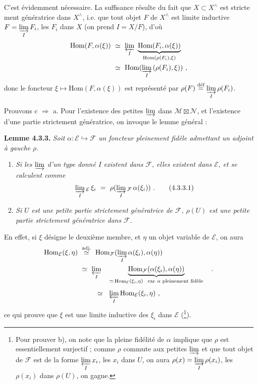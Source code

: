\documentclass[11pt]{article}
\newcommand{\printedpage}[1]{\if\relax\detokenize{#1}\relax\else\marginpar{\footnotesize p.~#1}\fi}
\newcommand{\msp}[1]{\marginpar{\footnotesize [#1]}}
\newcommand{\Hom}{\mathrm{Hom}}
\begin{document}
\noindent C'est évidemment nécessaire. La suffisance résulte du fait que $X\subset X^\wedge$ est stricte%
\printedpage{10}%
\msp{page 67}%
ment génératrice dans $X^\wedge$, i.e. que tout objet $F$ de $X^\wedge$ est limite inductive $F=\varinjlim\limits_I F_i$, les $F_i$ dans $X$ (on prend $I=X/F$), d'où
\[
\begin{aligned}
\Hom(F,\alpha(\xi))\ &\simeq\ \varprojlim_I\ \underbrace{\Hom(F_i,\alpha(\xi))}_{\Hom(\rho(F_i),\xi)}\\
&\simeq\ \Hom(\varinjlim_I\,(\rho(F_i),\xi))\ ,
\end{aligned}
\]
donc le foncteur $\xi\longmapsto\Hom(F,\alpha(\xi))$ est représenté par $\rho(F)\overset{\text{déf}}{=}\varinjlim\limits_I\rho(F_i)$.

\noindent Prouvons c $\Longrightarrow$ a. Pour l'existence des petites $\varinjlim$ dans $\mathcal M\boxtimes\mathcal N$, et l'existence d'une partie strictement génératrice, on invoque le lemme général :

\noindent\textbf{Lemme 4.3.3.} \textit{Soit $\alpha:\mathcal E\hookrightarrow\mathcal F$ un foncteur pleinement fidèle admettant un adjoint à gauche $\rho$.}
\begin{enumerate}[label={}]
\item[\textcircled{a}] \textit{Si les $\varinjlim$ d'un type donné $I$ existent dans $\mathcal F$, elles existent dans $\mathcal E$, et se calculent comme}
\[
\varinjlim_I{}_{\mathcal E}\,\xi_i\ =\ \rho(\varinjlim_I{}_{\mathcal F}\,\alpha(\xi_i))\ .
\tag*{(4.3.3.1)}
\]
\item[\textcircled{b}] \textit{Si $U$ est une petite partie strictement génératrice de $\mathcal F$, $\rho(U)$ est une petite partie strictement génératrice dans $\mathcal F$.}
\end{enumerate}

\noindent En effet, si $\xi$ désigne le deuxième membre, et $\eta$ un objet variable de $\mathcal E$, on aura
\[
\begin{aligned}
\Hom_{\mathcal E}(\xi,\eta)\ &\overset{\text{adj.}}{\simeq}\ \Hom_{\mathcal F}(\varinjlim_I\alpha(\xi_i),\alpha(\eta))\\
&\simeq\ \varprojlim_I\quad\underbrace{\Hom_{\mathcal F}(\alpha(\xi_i),\alpha(\eta))}_{\simeq\,\Hom_{\mathcal E}(\xi_i,\eta)\ \ \text{car $\alpha$ pleinement fidèle}}\quad .
\end{aligned}
\]
\msp{page 68}
\[
\simeq\ \ \varprojlim_I\Hom_{\mathcal E}(\xi_i,\eta)\ ,
\]
ce qui prouve que $\xi$ est une limite inductive des $\xi_i$ dans $\mathcal E$ (\footnote{Pour prouver b), on note que la pleine fidélité de $\alpha$ implique que $\rho$ est essentiellement surjectif ; comme $\rho$ commute aux petites $\varinjlim$ et que tout objet de $\mathcal F$ est de la forme $\varprojlim\limits_I x_i$, les $x_i$ dans $U$, on aura $\rho(x)=\varinjlim\limits_I\rho(x_i)$, les $\rho(x_i)$ dans $\rho(U)$, on gagne.}).
\end{document}
